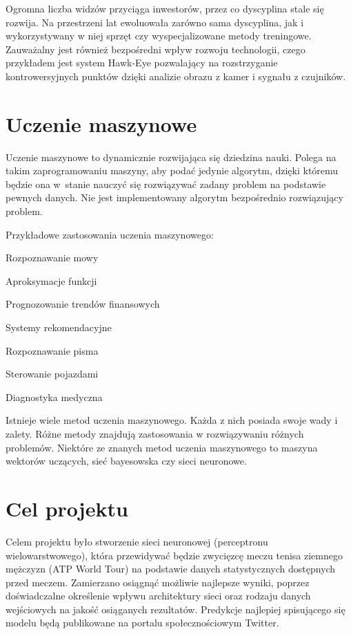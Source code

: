 Ogromna liczba widzów przyciąga inwestorów, przez co dyscyplina stale się rozwija. Na przestrzeni lat ewoluowała zarówno sama dyscyplina, jak i wykorzystywany w niej sprzęt czy wyspecjalizowane metody treningowe. Zauważalny jest również bezpośredni wpływ rozwoju technologii, czego przykładem jest system Hawk-Eye pozwalający na rozstrzyganie kontrowersyjnych punktów dzięki analizie obrazu z kamer i sygnału z czujników.



\section{Uczenie maszynowe}
\label{Sec:Machine}
Uczenie maszynowe to dynamicznie rozwijająca się dziedzina nauki. Polega na takim zaprogramowaniu maszyny, aby podać jedynie algorytm, dzięki któremu będzie ona w~stanie nauczyć się rozwiązywać zadany problem na podstawie pewnych danych. Nie jest implementowany algorytm bezpośrednio rozwiązujący problem. 

Przykładowe zastosowania uczenia maszynowego:
\begin{tightitemize}
\item Rozpoznawanie mowy
\item Aproksymacje funkcji
\item Prognozowanie trendów finansowych
\item Systemy rekomendacyjne
\item Rozpoznawanie pisma
\item Sterowanie pojazdami
\item Diagnostyka medyczna
\end{tightitemize}

Istnieje wiele metod uczenia maszynowego. Każda z nich posiada swoje wady i zalety. Różne metody znajdują zastosowania w rozwiązywaniu różnych problemów. Niektóre ze znanych metod uczenia maszynowego to maszyna wektorów uczących, sieć bayesowska czy sieci neuronowe. 

\section{Cel projektu}
\label{Sec:Goal}
Celem projektu było stworzenie sieci neuronowej (perceptronu wielowarstwowego), która przewidywać będzie zwycięzcę meczu tenisa ziemnego mężczyzn (ATP World Tour) na podstawie danych statystycznych dostępnych przed meczem. Zamierzano osiągnąć możliwie najlepsze wyniki, poprzez doświadczalne określenie wpływu architektury sieci oraz rodzaju danych wejściowych na jakość osiąganych rezultatów. Predykcje najlepiej spisującego się modelu będą publikowane na portalu społecznościowym Twitter.

